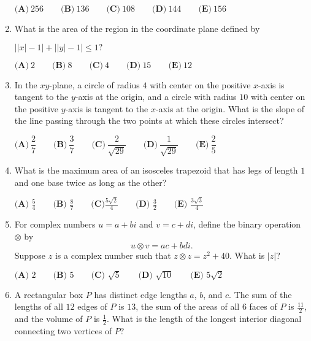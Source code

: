 \documentclass{article}
\begin{document}
\begin{enumerate}[label=\arabic*., itemsep=0.5em]
$\textbf{(A)}\ 256 \qquad\textbf{(B)}\ 136 \qquad\textbf{(C)}\ 108 \qquad\textbf{(D)}\ 144 \qquad\textbf{(E)}\ 156$\par \vspace{0.5em}\item What is the area of the region in the coordinate plane defined by

$\left||x|-1\right|+\left||y|-1\right|\leq 1?$

$\textbf{(A)}~2\qquad\textbf{(B)}~8\qquad\textbf{(C)}~4\qquad\textbf{(D)}~15\qquad\textbf{(E)}~12$\par \vspace{0.5em}\item In the $xy$-plane, a circle of radius $4$ with center on the positive $x$-axis is tangent to the $y$-axis at the origin, and a circle with radius $10$ with center on the positive $y$-axis is tangent to the $x$-axis at the origin. What is the slope of the line passing through the two points at which these circles intersect?

$\textbf{(A)}\ \dfrac{2}{7} \qquad\textbf{(B)}\ \dfrac{3}{7}  \qquad\textbf{(C)}\ \dfrac{2}{\sqrt{29}}  \qquad\textbf{(D)}\ \dfrac{1}{\sqrt{29}}  \qquad\textbf{(E)}\ \dfrac{2}{5}$\par \vspace{0.5em}\item What is the maximum area of an isosceles trapezoid that has legs of length $1$ and one base twice as long as the other?

$\textbf{(A) }\frac 54 \qquad \textbf{(B) } \frac 87 \qquad \textbf{(C)} \frac{5\sqrt2}4 \qquad \textbf{(D) } \frac 32  \qquad \textbf{(E) } \frac{3\sqrt3}4$\par \vspace{0.5em}\item For complex numbers $u=a+bi$ and $v=c+di$, define the binary operation $\otimes$ by
\begin{equation*}
u\otimes v=ac+bdi.
\end{equation*}
Suppose $z$ is a complex number such that $z\otimes z=z^{2}+40$. What is $|z|$?

$\textbf{(A) }2\qquad\textbf{(B) }5\qquad\textbf{(C) }\sqrt{5}\qquad\textbf{(D) }\sqrt{10}\qquad\textbf{(E) }5\sqrt{2}$\par \vspace{0.5em}\item A rectangular box $P$ has distinct edge lengths $a$, $b$, and $c$. The sum of the lengths of all $12$ edges of $P$ is $13$, the sum of the areas of all $6$ faces of $P$ is $\frac{11}{2}$, and the volume of $P$ is $\frac{1}{2}$. What is the length of the longest interior diagonal connecting two vertices of $P$?


\end{enumerate}
\end{document}
